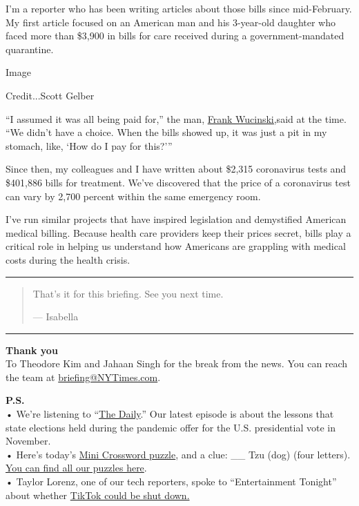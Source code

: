 I'm a reporter who has been writing articles about those bills since
mid-February. My first article focused on an American man and his
3-year-old daughter who faced more than \$3,900 in bills for care
received during a government-mandated quarantine.

Image

Credit...Scott Gelber

``I assumed it was all being paid for,'' the man,
\href{https://www.nytimes3xbfgragh.onion/2020/02/29/upshot/coronavirus-surprise-medical-bills.html}{Frank
Wucinski,}said at the time. ``We didn't have a choice. When the bills
showed up, it was just a pit in my stomach, like, `How do I pay for
this?'''

Since then, my colleagues and I have written about \$2,315 coronavirus
tests and \$401,886 bills for treatment. We've discovered that the price
of a coronavirus test can vary by 2,700 percent within the same
emergency room.

I've run similar projects that have inspired legislation and demystified
American medical billing. Because health care providers keep their
prices secret, bills play a critical role in helping us understand how
Americans are grappling with medical costs during the health crisis.

\begin{center}\rule{0.5\linewidth}{\linethickness}\end{center}

\begin{quote}
That's it for this briefing. See you next time.

--- Isabella
\end{quote}

\begin{center}\rule{0.5\linewidth}{\linethickness}\end{center}

\textbf{Thank you}\\
To Theodore Kim and Jahaan Singh for the break from the news. You can
reach the team at
\href{mailto:briefing+midnight@NYTimes.com?subject=Briefing\%20Feedback}{briefing@NYTimes.com}.

\textbf{P.S.}\\
• We're listening to
``\href{https://www.nytimes3xbfgragh.onion/thedaily}{The Daily}.'' Our
latest episode is about the lessons that state elections held during the
pandemic offer for the U.S. presidential vote in November.\\
• Here's today's
\href{https://www.nytimes3xbfgragh.onion/crosswords/game/mini}{Mini
Crossword puzzle}, and a clue: \_\_ Tzu (dog) (four letters).
\href{https://www.nytimes3xbfgragh.onion/crosswords}{You can find all
our puzzles here}.\\
• Taylor Lorenz, one of our tech reporters, spoke to ``Entertainment
Tonight'' about whether
\href{https://www.etonline.com/could-tiktok-really-get-shut-down-heres-what-you-need-to-know-150710}{TikTok
could be shut down.}

